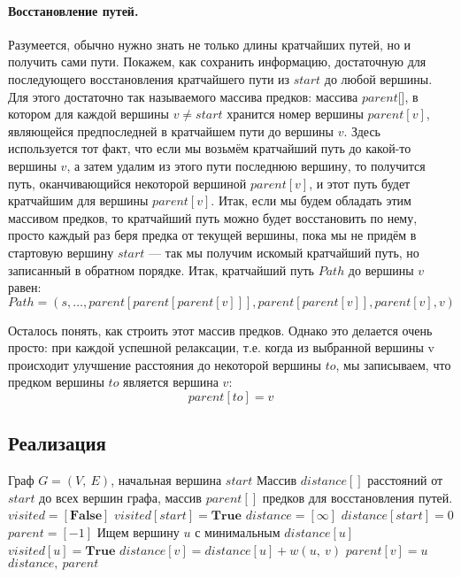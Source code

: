 \documentclass[a4paper,12pt]{article}
\begin{document}
\paragraph{Восстановление путей.}
Разумеется, обычно нужно знать не только длины кратчайших путей, но и получить сами пути. Покажем, как сохранить информацию, достаточную для последующего восстановления кратчайшего пути из $start$ до любой вершины. Для этого достаточно так называемого массива предков: массива $parent$[], в котором для каждой вершины $v \neq start$ хранится номер вершины $parent[v]$, являющейся предпоследней в кратчайшем пути до вершины $v$. Здесь используется тот факт, что если мы возьмём кратчайший путь до какой-то вершины $v$, а затем удалим из этого пути последнюю вершину, то получится путь, оканчивающийся некоторой вершиной $parent[v]$, и этот путь будет кратчайшим для вершины $parent[v]$. Итак, если мы будем обладать этим массивом предков, то кратчайший путь можно будет восстановить по нему, просто каждый раз беря предка от текущей вершины, пока мы не придём в стартовую вершину $start$ — так мы получим искомый кратчайший путь, но записанный в обратном порядке. Итак, кратчайший путь $Path$ до вершины $v$ равен:\[ Path = (s, \ldots, parent[parent[parent[v]]], parent[parent[v]], parent[v], v) \]

Осталось понять, как строить этот массив предков. Однако это делается очень просто: при каждой успешной релаксации, т.е. когда из выбранной вершины v происходит улучшение расстояния до некоторой вершины $to$, мы записываем, что предком вершины $to$ является вершина $v$:\[ parent[to] = v\] 

\subsection{Реализация}

\begin{algorithm}
  	\caption{($G,\ start$)}
	\begin{algorithmic}
	    \Require Граф $G = (V,\ E)$, начальная вершина $start$
	    \Ensure Массив $distance[]$ расстояний от $start$ до всех вершин графа, массив $parent[]$ предков для восстановления путей.
	    \State 
	    \State $visited = [\textbf{False}]$
	    \State $visited[start] = \textbf{True}$
	    \State $distance = [\infty]$
	    \State $distance[start] = 0$
	    \State $parent = [-1]$
	        \State Ищем вершину $u$ с минимальным $distance[u]$
	            \State \Return{}
	        \Else
	            \State $visited[u] = \textbf{True}$
	                    \State $distance[v] = distance[u] + w(u,\ v)$
	                    \State $parent[v] = u$
	                \EndIf
	           \EndFor
	       \EndIf
	   \EndFor
	   \Return $distance,\ parent$
	\end{algorithmic}
\end{algorithm}
\end{document}
